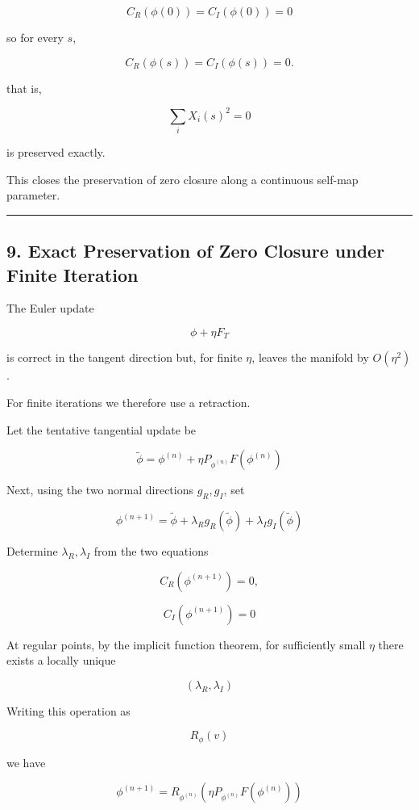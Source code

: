 \documentclass[
  a4paper,
]{article}
\begin{document}
\[
C_R(\phi(0))=C_I(\phi(0))=0
\]

so for every \(s\),

\[
\boxed{
C_R(\phi(s))
=
C_I(\phi(s))
=
0.
}
\tag{27}
\]

that is,

\[
\boxed{
\sum_iX_i(s)^2=0
}
\tag{28}
\]

is preserved exactly.

This closes the preservation of zero closure along a continuous self-map
parameter.

\begin{center}\rule{0.5\linewidth}{0.5pt}\end{center}

\subsection{9. Exact Preservation of Zero Closure under Finite
Iteration}\label{exact-preservation-of-zero-closure-under-finite-iteration}

The Euler update

\[
\phi+\eta F_T
\]

is correct in the tangent direction but, for finite \(\eta\), leaves the
manifold by \(O(\eta^2)\).

For finite iterations we therefore use a retraction.

Let the tentative tangential update be

\[
\widetilde\phi
=
\phi^{(n)}
+
\eta
P_{\phi^{(n)}}F(\phi^{(n)})
\tag{29}
\]

Next, using the two normal directions \(g_R,g_I\), set

\[
\phi^{(n+1)}
=
\widetilde\phi
+
\lambda_Rg_R(\widetilde\phi)
+
\lambda_Ig_I(\widetilde\phi)
\tag{30}
\]

Determine \(\lambda_R,\lambda_I\) from the two equations

\[
C_R(\phi^{(n+1)})=0,
\]

\[
C_I(\phi^{(n+1)})=0
\tag{31}
\]

At regular points, by the implicit function theorem, for sufficiently
small \(\eta\) there exists a locally unique

\[
(\lambda_R,\lambda_I)
\]

Writing this operation as

\[
R_\phi(v)
\]

we have

\[
\boxed{
\phi^{(n+1)}
=
R_{\phi^{(n)}}
\left(
\eta
P_{\phi^{(n)}}F(\phi^{(n)})
\right)
}
\tag{32}
\]
\end{document}
